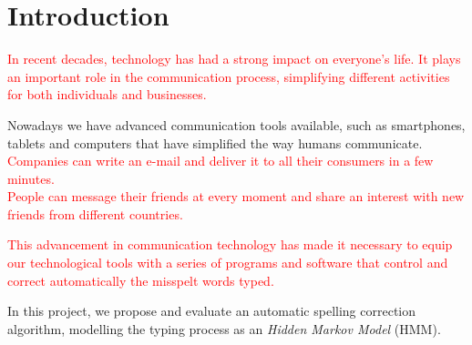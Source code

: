 \chapter{Introduction}
\label{chap:Introduction}

\textcolor{red}{In recent decades, technology has had a strong impact on everyone's life. It plays an important 
role in the communication process, simplifying different activities for both individuals and businesses.}

Nowadays we have advanced communication tools available, such as smartphones, tablets and computers that 
have simplified the way humans communicate. \\
\textcolor{red}{Companies can write an e-mail and deliver it to all their consumers in a few minutes. \\
People can message their friends at every moment and share an interest with new friends from different 
countries.}

\textcolor{red}{This advancement in communication technology has made it necessary to equip our technological tools with 
a series of programs and software that control and correct automatically the misspelt words typed.}

In this project, we propose and evaluate an automatic spelling correction algorithm, modelling the typing 
process as an \textit{Hidden Markov Model} (HMM). 
